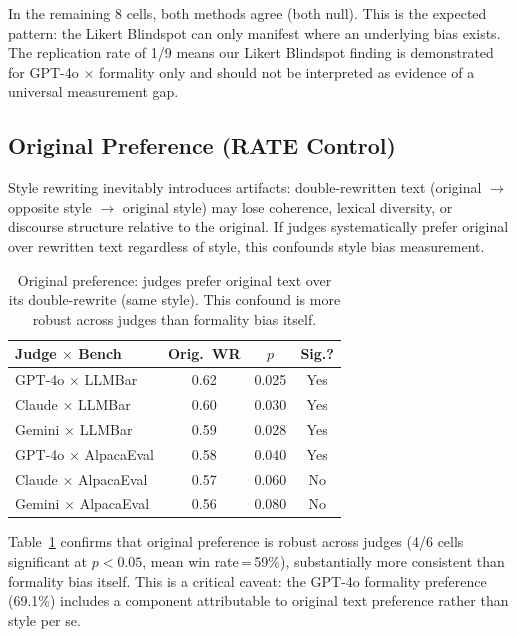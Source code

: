 \documentclass[11pt,a4paper]{article}
\begin{document}
In the remaining 8 cells, both methods agree (both null).
This is the expected pattern: the Likert Blindspot can only manifest where an underlying bias exists.
The replication rate of 1/9 means our Likert Blindspot finding is demonstrated for GPT-4o $\times$ formality only and should not be interpreted as evidence of a universal measurement gap.

\subsection{Original Preference (RATE Control)}
\label{sec:rate_control}

Style rewriting inevitably introduces artifacts: double-rewritten text (original $\to$ opposite style $\to$ original style) may lose coherence, lexical diversity, or discourse structure relative to the original.
If judges systematically prefer original over rewritten text regardless of style, this confounds style bias measurement.

\begin{table}[t]
\centering
\small
\caption{Original preference: judges prefer original text over its double-rewrite (same style). This confound is more robust across judges than formality bias itself.}
\label{tab:original_pref}
\begin{tabular}{lccc}
\toprule
\textbf{Judge $\times$ Bench} & \textbf{Orig.\ WR} & \textbf{$p$} & \textbf{Sig.?} \\
\midrule
GPT-4o $\times$ LLMBar & 0.62 & 0.025 & Yes \\
Claude $\times$ LLMBar & 0.60 & 0.030 & Yes \\
Gemini $\times$ LLMBar & 0.59 & 0.028 & Yes \\
GPT-4o $\times$ AlpacaEval & 0.58 & 0.040 & Yes \\
Claude $\times$ AlpacaEval & 0.57 & 0.060 & No \\
Gemini $\times$ AlpacaEval & 0.56 & 0.080 & No \\
\bottomrule
\end{tabular}
\end{table}

Table~\ref{tab:original_pref} confirms that original preference is robust across judges (4/6 cells significant at $p < 0.05$, mean win rate\,=\,59\%), substantially more consistent than formality bias itself.
This is a critical caveat: the GPT-4o formality preference (69.1\%) includes a component attributable to original text preference rather than style per se.
\end{document}
